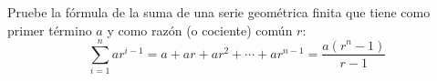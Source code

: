 \item Pruebe la fórmula de la suma de una serie geométrica finita que tiene como primer término $a$ y como razón (o cociente) común $r$:
$$\sum_{i=1}^n ar^{i-1} = a + ar + ar^2 + \cdots + ar^{n-1} = \frac{a(r^n - 1)}{r - 1}$$
